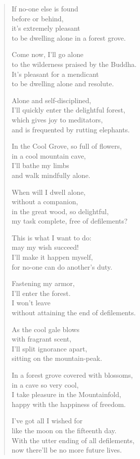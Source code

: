 \documentclass[12pt,openany]{book}%
\begin{document}
\begin{verse}%
If no-one else is found \\
before or behind, \\
it’s extremely pleasant \\
to be dwelling alone in a forest grove. 

Come now, I’ll go alone \\
to the wilderness praised by the Buddha. \\
It’s pleasant for a mendicant \\
to be dwelling alone and resolute. 

Alone and self-disciplined, \\
I’ll quickly enter the delightful forest, \\
which gives joy to meditators, \\
and is frequented by rutting elephants. 

In the Cool Grove, so full of flowers, \\
in a cool mountain cave, \\
I’ll bathe my limbs \\
and walk mindfully alone. 

When will I dwell alone, \\
without a companion, \\
in the great wood, so delightful, \\
my task complete, free of defilements? 

This is what I want to do: \\
may my wish succeed! \\
I’ll make it happen myself, \\
for no-one can do another’s duty. 

Fastening my armor, \\
I’ll enter the forest. \\
I won’t leave \\
without attaining the end of defilements. 

As the cool gale blows \\
with fragrant scent, \\
I’ll split ignorance apart, \\
sitting on the mountain-peak. 

In a forest grove covered with blossoms, \\
in a cave so very cool, \\
I take pleasure in the Mountainfold, \\
happy with the happiness of freedom. 

I’ve got all I wished for \\
like the moon on the fifteenth day. \\
With the utter ending of all defilements, \\
now there’ll be no more future lives. 

%
\end{verse}
\end{document}
